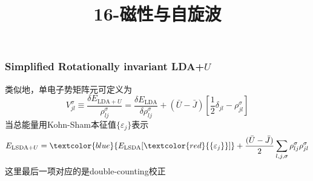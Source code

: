 {\frame
{
	\frametitle{\textrm{Simplified Rotationally invariant LDA+}$U$}
	类似地，单电子势矩阵元可定义为
	\begin{displaymath}
		V_{jl}^{\sigma}\equiv\frac{\delta E_{\mathrm{LDA+}U}}{\rho_{lj}^{\sigma}}=\frac{\delta E_{\mathrm{LDA}}}{\delta \rho_{lj}^{\sigma}}+(\bar U-\bar J)\left[\frac12\delta_{jl}-\rho_{jl}^{\sigma}\right]
	\end{displaymath}
	当总能量用\textrm{Kohn-Sham}本征值$\{\varepsilon_j\}$表示
	\begin{displaymath}
		E_{\textrm{LSDA+}U}=\textcolor{blue}{E_{\textrm{LSDA}}[\textcolor{red}{\{\varepsilon_j\}}]}+\frac{(\bar U-\bar J)}2\sum_{l,j,\sigma}\rho_{lj}^{\sigma}\rho_{jl}^{\sigma}
	\end{displaymath}
	这里最后一项对应的是\textrm{double-counting}校正
}

\title{16-磁性与自旋波}
}
